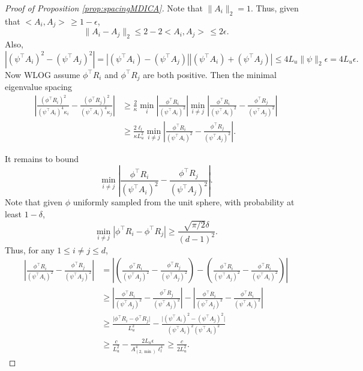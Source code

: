 \documentclass[11pt]{article}
\newcommand{\eps}{\epsilon}
\begin{document}
\begin{proof}[Proof of Proposition \ref{prop:spacingMDICA}]
	Note that $\|A_i\|_2 = 1$.  Thus, given that $<A_i, A_j> \,\ge 1-\eps$, 
	\[
	\|A_i - A_j\|_2 \le 2 - 2<A_i, A_j>\, \le 2\eps.
	\]
	Also, 
	\[
	|(\psi^{\top}A_i)^2 -(\psi^{\top}A_j)^2 |  =  |(\psi^{\top}A_i) -(\psi^{\top}A_j)| |(\psi^{\top}A_i) +(\psi^{\top}A_j)| \le 4L_u\|\psi\|_2 \eps = 4L_u\eps. 
	\]
	Now WLOG assume $\phi^{\top}R_i$ and $\phi^{\top}R_j$ are both positive. Then the minimal eigenvalue spacing 
	\begin{align*}
	\left\vert \frac{(\phi^{\top}R_i)^2}{(\psi^{\top}A_i)^4\kappa_i}  -  \frac{(\phi^{\top}R_j)^2}{(\psi^{\top}A_i)^4\kappa_j} \right\vert 
	& \ge \frac{2}{\kappa} \min_i \left\vert  \frac{\phi^{\top}R_i}{(\psi^{\top}A_i)^2} \right\vert \min_{i\neq j} \left\vert  \frac{\phi^{\top}R_i}{(\psi^{\top}A_i)^2} -  \frac{\phi^{\top}R_j}{(\psi^{\top}A_j)^2}\right\vert 
	\\
	& \ge \frac{2\ell_l}{\kappa L_u^2} \min_{i\neq j} \left\vert  \frac{\phi^{\top}R_i}{(\psi^{\top}A_i)^2} -  \frac{\phi^{\top}R_j}{(\psi^{\top}A_j)^2} \right\vert. 
	\end{align*}
	
	It remains to bound 
	\[
	\min_{i\neq j} \left\vert  \frac{\phi^{\top}R_i}{(\psi^{\top}A_i)^2} -  \frac{\phi^{\top}R_j}{(\psi^{\top}A_j)^2}\right\vert.
	\]
	Note that given $\phi$ uniformly sampled from the unit sphere, with probability at least $1-\delta$,
	\[
	\min_{i\neq j} |\phi^{\top} R_i - \phi^{\top} R_j| \ge \frac{\sqrt{\pi/2}\delta}{(d-1)^2}.
	\]
	Thus, for any $1\le i\neq j \le d$,
	\begin{align*}
	\left\vert  \frac{\phi^{\top}R_i}{(\psi^{\top}A_i)^2} -  \frac{\phi^{\top}R_j}{(\psi^{\top}A_j)^2} \right\vert 
	&
	=  \left\vert \left(\frac{\phi^{\top}R_i}{(\psi^{\top}A_j)^2} -   \frac{\phi^{\top}R_j}{(\psi^{\top}A_j)^2}\right) - \left(\frac{\phi^{\top}R_i}{(\psi^{\top}A_j)^2} - \frac{\phi^{\top}R_i}{(\psi^{\top}A_i)^2} \right) \right\vert \\
	& \ge  \left\vert \frac{\phi^{\top}R_i}{(\psi^{\top}A_j)^2} -   \frac{\phi^{\top}R_j}{(\psi^{\top}A_j)^2} \right\vert - \left\vert \frac{\phi^{\top}R_i}{(\psi^{\top}A_j)^2} - \frac{\phi^{\top}R_i}{(\psi^{\top}A_i)^2} \right\vert \\
	& \ge \frac{\vert \phi^{\top}R_i -  \phi^{\top}R_j \vert }{L_u^2} - \frac{\vert (\psi^{\top}A_i)^2 - (\psi^{\top}A_j)^2 \vert }{(\psi^{\top}A_i)^2(\psi^{\top}A_i)^2} \\
	& \ge \frac{c}{L_u^2} - \frac{2L_u\eps}{A_{(2,\min)}^4\ell_l^4} \ge \frac{c}{2L_u^2}.
	\end{align*}
\end{proof}
\end{document}
